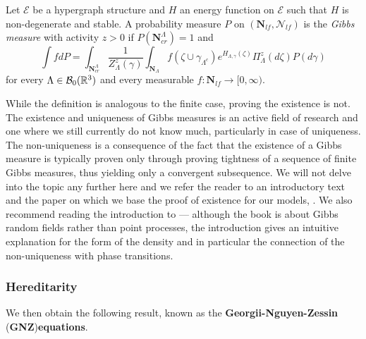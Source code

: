 \begin{definition}
	Let $\mathcal E$ be a hypergraph structure and $H$ an energy function on $\mathcal E$ such that $H$ is non-degenerate and stable. A probability measure $P$ on $(\mathbf N_{lf},\mathcal N_{lf})$ is the \textit{Gibbs measure} with activity $z>0$ if $P(\mathbf N^\Lambda_{cr})=1$ and
	$$\int f dP = \int_{\mathbf N^\Lambda_{cr}} \frac 1 {Z^z_{\Lambda}(\gamma)} \int_{\mathbf N_\Lambda} f(\zeta \cup \gamma_{\Lambda^c}) e^{H_{\Lambda,\gamma}(\zeta)} \Pi^z_\Lambda (d\zeta) P(d\gamma)$$
		for every $\Lambda \in \mathcal B_0({\mathbb R^3})$ and every measurable $f:\mathbf N_{lf} \to [0,\infty)$.
\end{definition}


While the definition is analogous to the finite case, proving the existence is not. The existence and uniqueness of Gibbs measures is an active field of research and one where we still currently do not know much, particularly in case of uniqueness. The non-uniqueness is a consequence of the fact that the existence of a Gibbs measure is typically proven only through proving tightness of a sequence of finite Gibbs measures, thus yielding only a convergent subsequence. We will not delve into the topic any further here and we refer the reader to an introductory text \cite{Dereudre2017} and the paper on which we base the proof of existence for our models, \cite{DDG12}. We also recommend reading the introduction to \cite{Georgii2011} --- although the book is about Gibbs random fields rather than point processes, the introduction gives an intuitive explanation for the form of the density and in particular the connection of the non-uniqueness with phase transitions.


\subsubsection{Hereditarity}

We then obtain the following result, known as the \textbf{Georgii-Nguyen-Zessin }(\textbf{GNZ})\textbf{equations}. 

